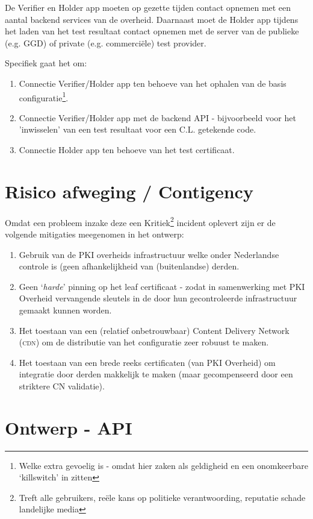 \documentclass[11.0pt,twoside,openright]{report}
\begin{document}
De Verifier en Holder app moeten op gezette tijden contact opnemen met een aantal backend services van de overheid. Daarnaast moet de Holder app tijdens het laden van het test resultaat contact opnemen met de server van de publieke (e.g. GGD) of private (e.g. commerciële) test provider. 

Specifiek gaat het om:

\begin{enumerate}
\item	Connectie Verifier/Holder app ten behoeve van het ophalen van de basis configuratie\footnote{Welke extra gevoelig is - omdat hier zaken als geldigheid en een onomkeerbare `killswitch' in zitten}.
\item	Connectie Verifier/Holder app met de backend API - bijvoorbeeld voor het 'inwisselen' van een test resultaat voor een C.L. getekende code.
\item 	Connectie Holder app ten behoeve van het test certificaat.
\end{enumerate}

\section{Risico afweging / Contigency}

Omdat een probleem inzake deze een  Kritiek\footnote{Treft alle gebruikers, reële kans op politieke verantwoording, reputatie schade landelijke media} incident oplevert zijn er de volgende mitigaties meegenomen in het ontwerp:

\begin{enumerate}
\item Gebruik van de PKI overheids infrastructuur welke onder Nederlandse controle is (geen afhankelijkheid van (buitenlandse) derden.
\item Geen `\emph{harde}' pinning op het leaf certificaat - zodat in samenwerking met PKI Overheid vervangende sleutels in de door hun gecontroleerde infrastructuur gemaakt kunnen worden.
\item Het toestaan van een (relatief onbetrouwbaar) Content Delivery Network (\textsc{cdn}) om de distributie van het configuratie zeer robuust te maken.
\item Het toestaan van een brede reeks certificaten (van PKI Overheid) om integratie door derden makkelijk te maken (maar gecompenseerd door een striktere CN validatie).
\end{enumerate}


\section{Ontwerp - API}
\label{api}
\end{document}
